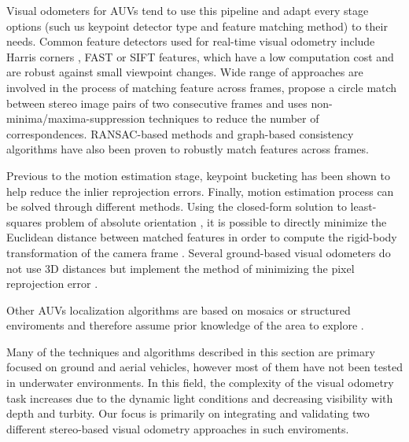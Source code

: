 \documentclass[conference]{IEEEtran}
\begin{document}
Visual odometers for AUVs tend to use this pipeline \cite{Botelho2009} and adapt every stage options (such us keypoint detector type and feature matching method) to their needs. Common feature detectors used for real-time visual odometry include Harris corners \cite{Harris1988,Nister2006}, FAST \cite{Rosten2006,Huang2011} or SIFT \cite{Lowe2004,Botelho2009} features, which have a low computation cost and are robust against small viewpoint changes. Wide range of approaches are involved in the process of matching feature across frames, \cite{Geiger2011} propose a circle match between stereo image pairs of two consecutive frames and uses non-minima/maxima-suppression techniques \cite{Geiger2010} to reduce the number of correspondences. RANSAC-based methods \cite{Nister2004,Johnson2008} and graph-based consistency algorithms \cite{Howard2008} have also been proven to robustly match features across frames.

Previous to the motion estimation stage, keypoint bucketing \cite{Zhang1995} has been shown to help reduce the inlier reprojection errors. Finally, motion estimation process can be solved through different methods. Using the closed-form solution to least-squares problem of absolute orientation \cite{Horn1987}, it is possible to directly minimize the Euclidean distance between matched features in order to compute the rigid-body transformation of the camera frame \cite{Huang2011}. Several ground-based visual odometers do not use 3D distances but implement the method of minimizing the pixel reprojection error \cite{Howard2008,Geiger2011}. 

Other AUVs localization algorithms are based on mosaics or structured enviroments and therefore assume prior knowledge of the area to explore \cite{Garcia2001,Gracias2003,Carreras2003}.

Many of the techniques and algorithms described in this section are primary focused on ground and aerial vehicles, however most of them have not been tested in underwater environments. In this field, the complexity of the visual odometry task increases due to the dynamic light conditions and decreasing visibility with depth and turbity. Our focus is primarily on integrating and validating two different stereo-based visual odometry approaches in such enviroments.
\end{document}
